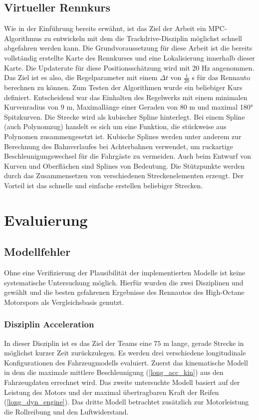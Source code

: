 \documentclass{like}
\begin{document}
\section{Virtueller Rennkurs}
Wie in der Einführung bereits erwähnt, ist das Ziel der Arbeit ein \ac{MPC}-Algorithmus zu entwickeln mit dem die Trackdrive-Disziplin möglichst schnell abgefahren werden kann. Die Grundvoraussetzung für diese Arbeit ist die bereits vollständig erstellte Karte des Rennkurses und eine Lokalisierung innerhalb dieser Karte. Die Updaterate für diese Positionsschätzung wird mit 20 Hz angenommen. Das Ziel ist es also, die Regelparameter mit einem $\Delta t$ von $\frac{1}{20}$ s für das Rennauto berechnen zu können. Zum Testen der Algorithmen wurde ein beliebiger Kurs definiert. Entscheidend war das Einhalten des Regelwerks mit einem minimalen Kurvenradius von 9 m, Maximallänge einer Geraden von 80 m und maximal 180° Spitzkurven. Die Strecke wird als kubischer Spline hinterlegt. Bei einem Spline (auch Polynomzug) handelt es sich um eine Funktion, die stückweise aus Polynomen zusammengesetzt ist. Kubische Splines werden unter anderem zur Berechnung des Bahnverlaufes bei Achterbahnen verwendet, um ruckartige Beschleunigungswechsel für die Fahrgäste zu vermeiden. Auch beim Entwurf von Kurven und Oberflächen sind Splines von Bedeutung. Die Stützpunkte werden durch das Zusammensetzen von verschiedenen Streckenelementen erzeugt. Der Vorteil ist das schnelle und einfache erstellen beliebiger Strecken. 

\chapter{Evaluierung}
\section{Modellfehler}
\label{modelError}
Ohne eine Verifizierung der Plausibilität der implementierten Modelle ist keine systematische Untersuchung möglich. Hierfür wurden die zwei Disziplinen  und  gewählt und die besten gefahrenen Ergebnisse des Rennautos des High-Octane Motorspors als Vergleichsbasis genutzt.


\subsection{Disziplin Acceleration}
In dieser Disziplin ist es das Ziel der Teams eine $75$ m lange, gerade Strecke in möglichst kurzer Zeit zurückzulegen.
Es werden drei verschiedene longitudinale Konfigurationen des Fahrzeugmodells evaluiert. Zuerst das kinematische Modell in dem die maximale mittlere Beschleunigung (\ref{long_acc_kin}) aus den Fahrzeugdaten errechnet wird. Das zweite untersuchte Modell basiert auf der Leistung des Motors und der maximal übertragbaren Kraft der Reifen (\ref{long_dyn_engine}).
Das dritte Modell betrachtet zusätzlich zur Motorleistung die Rollreibung und den Luftwiderstand. 
\end{document}
